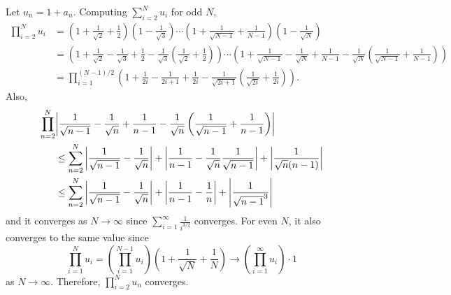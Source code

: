 \documentclass{article}
\begin{document}
\begin{enumerate}
Let $u_n=1+a_n$. Computing $\sum\limits_{i=2}^N u_i$ for odd $N$,
\begin{equation*}
\begin{split}
\prod\limits_{i=2}^N u_i&=\left(1+\frac{1}{\sqrt{2}}+\frac{1}{2}\right)\left(1-\frac{1}{\sqrt{3}}\right)\cdots\left(1+\frac{1}{\sqrt{N-1}}+\frac{1}{N-1}\right)\left(1-\frac{1}{\sqrt{N}}\right) \\
&=\left(1+\frac{1}{\sqrt{2}}-\frac{1}{\sqrt{3}}+\frac{1}{2}-\frac{1}{\sqrt{3}}\left(\frac{1}{\sqrt{2}}+\frac{1}{2}\right)\right)\cdots \left(1+\frac{1}{\sqrt{N-1}}-\frac{1}{\sqrt{N}}+\frac{1}{N-1}-\frac{1}{\sqrt{N}}\left(\frac{1}{\sqrt{N-1}}+\frac{1}{N-1}\right)\right)\\
&=\prod_{i=1}^{(N-1)/2}\left(1+\frac{1}{2i}-\frac{1}{2i+1}+\frac{1}{2i}-\frac{1}{\sqrt{2i+1}}\left(\frac{1}{\sqrt{2i}}+\frac{1}{2i}\right)\right)
.
\end{split}
\end{equation*}
Also,
\begin{equation*}
\begin{split}
\prod\limits_{n=2}^N &\abs{\frac{1}{\sqrt{n-1}}-\frac{1}{\sqrt{n}}+\frac{1}{n-1}-\frac{1}{\sqrt{n}}\left(\frac{1}{\sqrt{n-1}}+\frac{1}{n-1}\right)} \\
&\leq \sum\limits_{n=2}^N \abs{\frac{1}{\sqrt{n-1}}-\frac{1}{\sqrt{n}}}+\abs{\frac{1}{n-1}-\frac{1}{\sqrt{n}}\frac{1}{\sqrt{n-1}}}+\abs{\frac{1}{\sqrt{n}(n-1)}} \\
&\leq \sum\limits_{n=2}^N \abs{\frac{1}{\sqrt{n-1}}-\frac{1}{\sqrt{n}}}+\abs{\frac{1}{n-1}-\frac{1}{n}}+\abs{\frac{1}{\sqrt{n-1}^3}}
\end{split}
\end{equation*}
and it converges as $N\rightarrow \infty$ since $\sum\limits_{i=1}^\infty \frac{1}{i^{3/2}}$ converges. For even $N$, it also converges to the same value since 
\begin{equation*}
\prod_{i=1}^N u_i=\left(\prod_{i=1}^{N-1} u_i\right)\left(1+\frac{1}{\sqrt{N}}+\frac{1}{N}\right)\rightarrow \left(\prod_{i=1}^{\infty} u_i\right)\cdot 1
\end{equation*}
as $N\rightarrow \infty$. Therefore, $\prod\limits_{i=2}^N u_n$ converges.


\end{enumerate}
\end{document}
